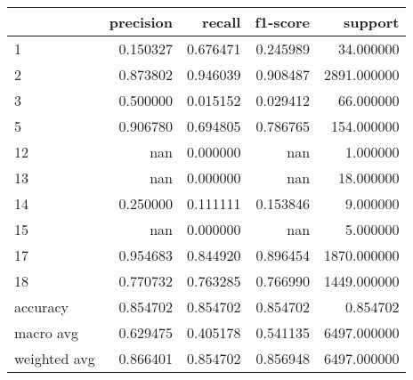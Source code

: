 \begin{tabular}{lrrrr}
\toprule
 & precision & recall & f1-score & support \\
\midrule
1 & 0.150327 & 0.676471 & 0.245989 & 34.000000 \\
2 & 0.873802 & 0.946039 & 0.908487 & 2891.000000 \\
3 & 0.500000 & 0.015152 & 0.029412 & 66.000000 \\
5 & 0.906780 & 0.694805 & 0.786765 & 154.000000 \\
12 & nan & 0.000000 & nan & 1.000000 \\
13 & nan & 0.000000 & nan & 18.000000 \\
14 & 0.250000 & 0.111111 & 0.153846 & 9.000000 \\
15 & nan & 0.000000 & nan & 5.000000 \\
17 & 0.954683 & 0.844920 & 0.896454 & 1870.000000 \\
18 & 0.770732 & 0.763285 & 0.766990 & 1449.000000 \\
accuracy & 0.854702 & 0.854702 & 0.854702 & 0.854702 \\
macro avg & 0.629475 & 0.405178 & 0.541135 & 6497.000000 \\
weighted avg & 0.866401 & 0.854702 & 0.856948 & 6497.000000 \\
\bottomrule
\end{tabular}
